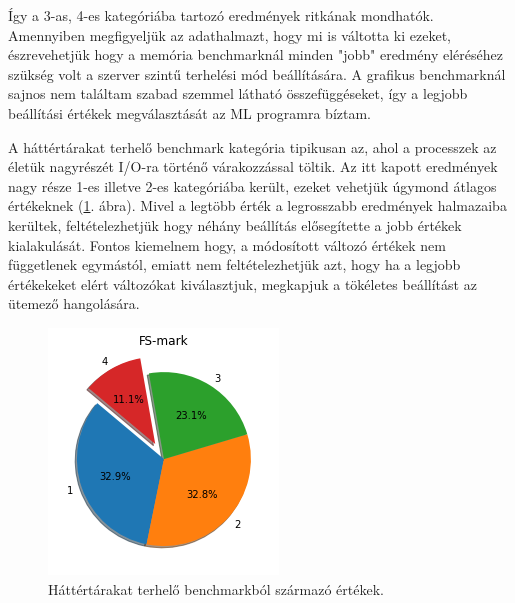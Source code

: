 Így a 3-as, 4-es kategóriába tartozó eredmények ritkának mondhatók. Amennyiben megfigyeljük az adathalmazt, hogy mi is váltotta ki ezeket, észrevehetjük hogy a memória benchmarknál minden "jobb" eredmény eléréséhez szükség volt a szerver szintű terhelési mód beállítására.
A grafikus benchmarknál sajnos nem találtam szabad szemmel látható összefüggéseket, így a legjobb beállítási értékek megválasztását az ML programra bíztam.


A háttértárakat terhelő benchmark kategória tipikusan az, ahol a processzek az életük nagyrészét I/O-ra történő várakozzással töltik.
Az itt kapott eredmények nagy része 1-es illetve 2-es kategóriába került, ezeket vehetjük úgymond átlagos értékeknek (\ref{fig:diskChart}. ábra). Mivel a legtöbb érték a legrosszabb eredmények halmazaiba kerültek, feltételezhetjük hogy néhány beállítás elősegítette a jobb értékek kialakulását. 
Fontos kiemelnem hogy, a módosított változó értékek nem függetlenek egymástól, emiatt nem feltételezhetjük azt, hogy ha a legjobb értékekeket elért változókat kiválasztjuk, megkapjuk a tökéletes beállítást az ütemező hangolására.

\begin{figure}[h!]
\centering
\includegraphics[scale=0.8]{images/diskBenchmarkValue.png}
\caption{Háttértárakat terhelő benchmarkból származó értékek.}
\label{fig:diskChart}
\end{figure}


